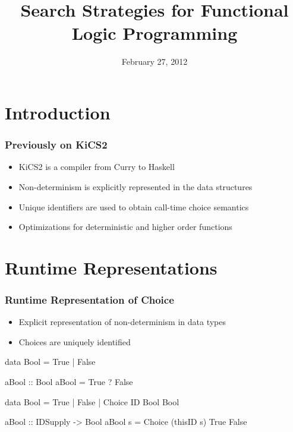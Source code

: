 \documentclass[
,hyperref={pdfpagelabels=false}
]{beamer}
\title[Search Strategies for FLP]
{Search Strategies for Functional Logic Programming}
\date{February 27, 2012}
\author[Hanus, Peemöller, \underline{Reck}]{%
\texorpdfstring
  {Michael Hanus \and Björn Peemöller \and \underline{Fabian Reck}}
  {Michael Hanus \and Björn Peemöller \and Fabian Reck}
}
\institute{Kiel University}
\begin{document}
\begin{frame}%
\titlepage
\end{frame}


\section{Introduction}

\begin{frame}[fragile]
\frametitle{Previously on KiCS2}
\begin{itemize}
\item KiCS2 is a compiler from Curry to Haskell
\item Non-determinism is explicitly represented in
      the data structures
\item Unique identifiers are used to obtain
      call-time choice semantics
\item Optimizations for deterministic and higher order functions
\end{itemize}
\end{frame}


\section{Runtime Representations}

\begin{frame}[fragile]%
\frametitle{Runtime Representation of Choice}
\begin{itemize}
  \item Explicit representation of non-determinism in data types
  \item Choices are uniquely identified
\end{itemize}

\begin{curry}
data Bool = True | False

aBool :: Bool
aBool = True ? False
\end{curry}

\begin{haskell}
data Bool = True | False | Choice ID Bool Bool

aBool :: IDSupply -> Bool
aBool s = Choice (thisID s) True False
\end{haskell}
\end{frame}
\end{document}
